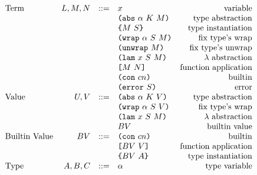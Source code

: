 \documentclass[../main.tex]{subfiles}
\begin{document}
\begin{figure*}[t]
    \centering
    \[\begin{array}{lrclr}
        \textrm{Term}             & L,M,N  &::= & x                          & \textrm{variable}\\
                                  &        &     & \texttt{(} \texttt{abs} ~ \alpha ~ K ~ M \texttt{)}         & \textrm{type abstraction}\\
                                  &        &     & \texttt{\{}M ~ S\texttt{\}}                & \textrm{type instantiation}\\
                                  &        &     & \texttt{(} \texttt{wrap} ~ \alpha ~ S ~ M \texttt{)}        & \textrm{fix type's wrap}\\
                                  &        &     & \texttt{(} \texttt{unwrap} ~ M \texttt{)}                 & \textrm{fix type's unwrap}\\
                                  &        &     & \texttt{(} \texttt{lam} ~ x ~ S ~ M \texttt{)}              & \textrm{$\lambda$ abstraction}\\
                                  &        &     & \texttt{[} M ~ N \texttt{]}                 & \textrm{function application}\\
                                  &        &     & \texttt{(} \texttt{con} ~ cn \texttt{)}                   & \textrm{builtin}\\
                                  &        &     & \texttt{(} \texttt{error} ~ S \texttt{)}                  & \textrm{error}\\
        \textrm{Value}            &U, V    & ::= & \texttt{(} \texttt{abs} ~ \alpha ~ K ~ V \texttt{)}         & \textrm{type abstraction}\\
                                  &        &     & \texttt{(} \texttt{wrap} ~ \alpha ~ S ~ V \texttt{)}        & \textrm{fix type's wrap}\\
                                  &        &     & \texttt{(} \texttt{lam} ~ x ~ S ~ M \texttt{)}              & \textrm{$\lambda$ abstraction}\\
                                  &        &     & BV                         & \textrm{builtin value}\\
        \textrm{Builtin Value}    & BV     & ::= & \texttt{(} \texttt{con} ~ cn \texttt{)}                   & \textrm{builtin}\\
                                  &        &     & \texttt{[} BV ~ V \texttt{]}                & \textrm{function application}\\
                                  &        &     & \texttt{\{}BV ~ A\texttt{\}}               & \textrm{type instantiation}\\
        \textrm{Type}             & A,B,C  & ::= & \alpha                     & \textrm{type variable}\\

\end{array}\]
\end{figure*}
\end{document}
